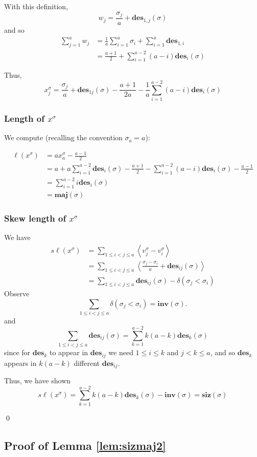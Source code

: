 \documentclass{amsart}[12pt]
\theoremstyle{definition}
\newcommand{\sk}{s\ell}
\newcommand{\inv}{\mathbf{inv}}
\newcommand{\des}{\mathbf{des}}
\newcommand{\maj}{\mathbf{maj}}
\newcommand{\siz}{\mathbf{siz}}
\begin{document}
With this definition,
$$w_j=\frac{\sigma_j}{a}+\des_{1,j}(\sigma)$$
and so
\begin{align*}
\sum_{j=1}^a w_j &=\frac{1}{a}\sum_{i=1}^a \sigma_i +\sum_{i=1}^a \des_{1,i} \\
 &=\frac{a+1}{2}+\sum_{i=1}^{a-2} (a-i)\des_i(\sigma)
\end{align*}

Thus,
$$x^\sigma_j=\frac{\sigma_j}{a}+\des_{1j}(\sigma)-\frac{a+1}{2a}-\frac{1}{a}\sum_{i=1}^{a-2} (a-i)\des_i(\sigma)$$

\subsubsection{Length of $x^\sigma$}
We compute (recalling the convention $\sigma_a=a$):

\begin{align*}
\ell(x^\sigma) &= a x^\sigma_a-\frac{a-1}{2} \\
&=a+a\sum_{i=1}^{a-2} \des_i(\sigma)-\frac{a+1}{2}-\sum_{i=1}^{a-2} (a-i)\des_i(\sigma)-\frac{a-1}{2} \\
&=\sum_{i=1}^{a-2} i\des_i(\sigma) \\
&=\maj(\sigma)
\end{align*}


\subsubsection{Skew length of $x^\sigma$}
We have
\begin{align*}
\sk (x^\sigma) &=\sum_{1\leq i <j \leq a} \left\langle v^\sigma_j-v^\sigma_i\right\rangle \\
&=\sum_{1\leq i <j \leq a} \left\langle\frac{\sigma_j-\sigma_i}{a}+\des_{ij}(\sigma)\right\rangle \\
&=\sum_{1\leq i<j\leq a} \des_{ij}(\sigma)-\delta(\sigma_j<\sigma_i)
\end{align*}
Observe
$$\sum_{1\leq i<j\leq a} \delta(\sigma_j<\sigma_i)=\inv(\sigma).$$  
and
$$\sum_{1\leq i<j\leq a} \des_{ij}(\sigma)=\sum_{k=1}^{a-2} k(a-k)\des_k(\sigma)$$
since for $\des_k$ to appear in $\des_{ij}$ we need $1\leq i\leq k$ and $j<k\leq a$, and so $\des_k$ appears in $k(a-k)$ different $\des_{ij}$.

Thus, we have shown
$$\sk(x^\sigma)=\sum_{k=1}^{a-2} k(a-k)\des_k(\sigma)-\inv(\sigma)=\siz(\sigma)$$

\qed

\subsection{Proof of Lemma \ref{lem:sizmaj2}}
\end{document}

